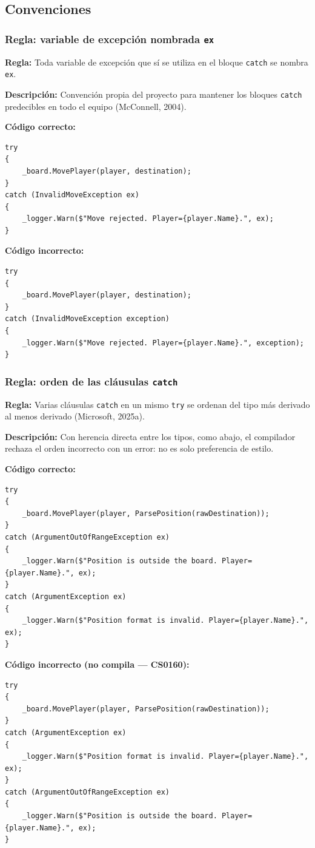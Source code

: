 \subsection{Convenciones}

\subsubsection{Regla: variable de excepción nombrada \texttt{ex}}

\textbf{Regla:} Toda variable de excepción que sí se utiliza en el bloque \texttt{catch} se nombra \texttt{ex}.

\textbf{Descripción:} Convención propia del proyecto para mantener los bloques \texttt{catch} predecibles en todo el equipo (McConnell, 2004).

\textbf{Código correcto:}
\begin{lstlisting}[style=csharpstyle]
try
{
    _board.MovePlayer(player, destination);
}
catch (InvalidMoveException ex)
{
    _logger.Warn($"Move rejected. Player={player.Name}.", ex);
}
\end{lstlisting}

\textbf{Código incorrecto:}
\begin{lstlisting}[style=csharpstyle]
try
{
    _board.MovePlayer(player, destination);
}
catch (InvalidMoveException exception)
{
    _logger.Warn($"Move rejected. Player={player.Name}.", exception);
}
\end{lstlisting}

\subsubsection{Regla: orden de las cláusulas \texttt{catch}}

\textbf{Regla:} Varias cláusulas \texttt{catch} en un mismo \texttt{try} se ordenan del tipo más derivado al menos derivado (Microsoft, 2025a).

\textbf{Descripción:} Con herencia directa entre los tipos, como abajo, el compilador rechaza el orden incorrecto con un error: no es solo preferencia de estilo.

\textbf{Código correcto:}
\begin{lstlisting}[style=csharpstyle]
try
{
    _board.MovePlayer(player, ParsePosition(rawDestination));
}
catch (ArgumentOutOfRangeException ex)
{
    _logger.Warn($"Position is outside the board. Player={player.Name}.", ex);
}
catch (ArgumentException ex)
{
    _logger.Warn($"Position format is invalid. Player={player.Name}.", ex);
}
\end{lstlisting}

\textbf{Código incorrecto (no compila --- CS0160):}
\begin{lstlisting}[style=csharpstyle]
try
{
    _board.MovePlayer(player, ParsePosition(rawDestination));
}
catch (ArgumentException ex)
{
    _logger.Warn($"Position format is invalid. Player={player.Name}.", ex);
}
catch (ArgumentOutOfRangeException ex)
{
    _logger.Warn($"Position is outside the board. Player={player.Name}.", ex);
}
\end{lstlisting}
